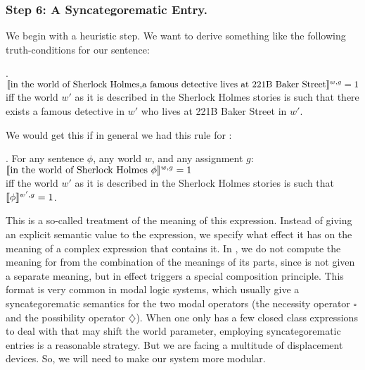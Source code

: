 \subsubsection{Step 6: A Syncategorematic Entry.} \label{sec:sync-entry}

We begin with a heuristic step. We want to derive something like the following
truth-conditions for our sentence:

\ex. $\llbracket \mbox{in the world of Sherlock Holmes,}\\
  \mbox{a famous detective lives at 221B Baker Street} \rrbracket^{w,g} = 1$\\
iff the world $w'$ as it is described in the Sherlock Holmes stories is such
that there exists a famous detective in $w'$ who lives at 221B Baker Street in
$w'$.

We would get this if in general we had this rule for :

\ex. For any sentence $\phi$, any world $w$, and any assignment $g$:\\
$\llbracket \mbox{in the world of Sherlock Holmes }\phi \rrbracket^{w,g} = 1$\\
iff the world $w'$ as it is described in the Sherlock Holmes stories is such
that $\llbracket \phi \rrbracket^{w',g} = 1$.

This is a so-called  treatment of the meaning of this
expression. Instead of giving an explicit semantic value to the expression, we
specify what effect it has on the meaning of a complex expression that contains
it. In \Last, we do not compute the meaning for  from the combination of the meanings of its parts,
since  is not given a separate
meaning, but in effect triggers a special composition principle. This %
%
format is very common in modal logic systems, which usually give a
syncategorematic semantics for the two modal operators (the necessity operator
$\square$ and the possibility operator $\diamondsuit$). When one only has a few
closed class expressions to deal with that may shift the world parameter,
employing syncategorematic entries is a reasonable strategy. But we are facing a
multitude of displacement devices. So, we will need to make our system more
modular.

